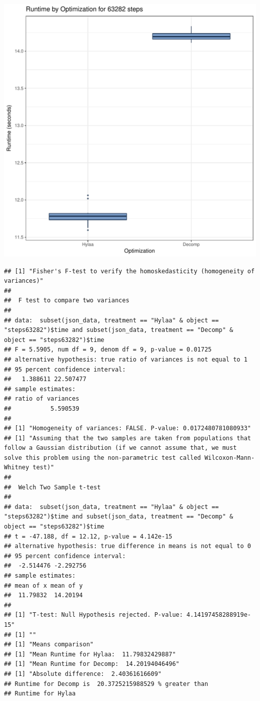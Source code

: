 \documentclass{article}\usepackage[]{graphicx}\usepackage[]{color}
\makeatletter
\def\maxwidth{ %
  \ifdim\Gin@nat@width>\linewidth
    \linewidth
  \else
    \Gin@nat@width
  \fi
}
\newenvironment{kframe}{%
 \def\at@end@of@kframe{}%
 \ifinner\ifhmode%
  \def\at@end@of@kframe{\end{minipage}}%
  \begin{minipage}{\columnwidth}%
 \fi\fi%
 \def\FrameCommand##1{\hskip\@totalleftmargin \hskip-\fboxsep
 \colorbox{shadecolor}{##1}\hskip-\fboxsep
     \hskip-\linewidth \hskip-\@totalleftmargin \hskip\columnwidth}%
 \MakeFramed {\advance\hsize-\width
   \@totalleftmargin\z@ \linewidth\hsize
   \@setminipage}}%
 {\par\unskip\endMakeFramed%
 \at@end@of@kframe}
\newenvironment{knitrout}{}{} %
\makeatother
\begin{document}
\begin{knitrout}
\color{fgcolor}
\includegraphics[width=\maxwidth]{figure/RH2_steps63282-1} 
\begin{kframe}\begin{verbatim}
## [1] "Fisher's F-test to verify the homoskedasticity (homogeneity of variances)"
## 
## 	F test to compare two variances
## 
## data:  subset(json_data, treatment == "Hylaa" & object == "steps63282")$time and subset(json_data, treatment == "Decomp" & object == "steps63282")$time
## F = 5.5905, num df = 9, denom df = 9, p-value = 0.01725
## alternative hypothesis: true ratio of variances is not equal to 1
## 95 percent confidence interval:
##   1.388611 22.507477
## sample estimates:
## ratio of variances 
##           5.590539 
## 
## [1] "Homogeneity of variances: FALSE. P-value: 0.0172480781080933"
## [1] "Assuming that the two samples are taken from populations that follow a Gaussian distribution (if we cannot assume that, we must solve this problem using the non-parametric test called Wilcoxon-Mann-Whitney test)"
## 
## 	Welch Two Sample t-test
## 
## data:  subset(json_data, treatment == "Hylaa" & object == "steps63282")$time and subset(json_data, treatment == "Decomp" & object == "steps63282")$time
## t = -47.188, df = 12.12, p-value = 4.142e-15
## alternative hypothesis: true difference in means is not equal to 0
## 95 percent confidence interval:
##  -2.514476 -2.292756
## sample estimates:
## mean of x mean of y 
##  11.79832  14.20194 
## 
## [1] "T-test: Null Hypothesis rejected. P-value: 4.14197458288919e-15"
## [1] ""
## [1] "Means comparison"
## [1] "Mean Runtime for Hylaa:  11.79832429887"
## [1] "Mean Runtime for Decomp:  14.20194046496"
## [1] "Absolute difference:  2.40361616609"
## Runtime for Decomp is  20.3725215988529 % greater than 
## Runtime for Hylaa
\end{verbatim}
\end{kframe}
\end{knitrout}
\end{document}
